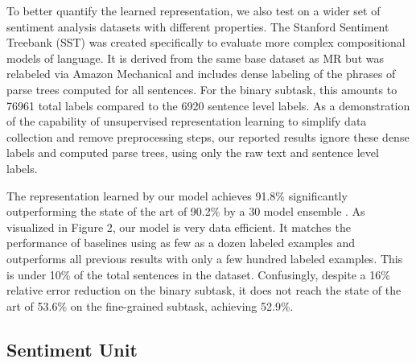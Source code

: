 To better quantify the learned representation, we also test on a wider set of sentiment analysis datasets with different properties. The Stanford Sentiment Treebank (SST) \cite{socher2013recursive} was created specifically to evaluate more complex compositional models of language. It is derived from the same base dataset as MR but was relabeled via Amazon Mechanical and includes dense labeling of the phrases of parse trees computed for all sentences. For the binary subtask, this amounts to 76961 total labels compared to the 6920 sentence level labels. As a demonstration of the capability of unsupervised representation learning to simplify data collection and remove preprocessing steps, our reported results ignore these dense labels and computed parse trees, using only the raw text and sentence level labels.

The representation learned by our model achieves 91.8\% significantly outperforming the state of the art of 90.2\% by a 30 model ensemble \cite{looks2017deep}. As visualized in Figure 2, our model is very data efficient. It matches the performance of baselines using as few as a dozen labeled examples and outperforms all previous results with only a few hundred labeled examples. This is under 10\% of the total sentences in the dataset. Confusingly, despite a 16\% relative error reduction on the binary subtask, it does not reach the state of the art of 53.6\% on the fine-grained subtask, achieving 52.9\%. 

\subsection{Sentiment Unit}

